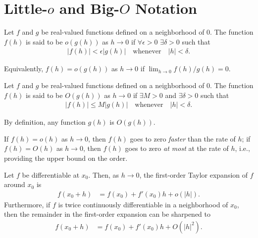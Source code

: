\documentclass[a4paper,12pt]{article}
\begin{document}
\appendix
\section{Little-$o$ and Big-$O$ Notation}

\begin{definition}\label{def-little-o}
	Let $f$ and $g$ be real-valued functions defined on a neighborhood of $0$.
	The function $f(h)$ is said to be $o(g(h))$ as $h \to 0$ if
	$\forall\epsilon>0$ $\exists\delta>0$ such that
	\begin{align}
		|f(h)| < \epsilon |g(h)|
		\quad\text{whenever}\quad
		|h| < \delta.
	\end{align}
\end{definition}

\begin{remark}
	Equivalently, $f(h) = o(g(h))$ as $h \to 0$ if $\lim_{h\to0}f(h)/g(h) = 0$.
\end{remark}

\begin{definition}\label{def-big-o}
	Let $f$ and $g$ be real-valued functions defined on a neighborhood of $0$.
	The function $f(h)$ is said to be $O(g(h))$ as $h \to 0$ if
	$\exists M>0$ and $\exists\delta>0$ such that
	\begin{align}
		|f(h)| \leq M |g(h)|
		\quad\text{whenever}\quad
		|h| < \delta.
	\end{align}
\end{definition}

\begin{remark}
	By definition, any function $g(h)$ is $O(g(h))$.
\end{remark}

\begin{remark}
	If $f(h)=o(h)$ as $h \to 0$, then $f(h)$ goes to zero \emph{faster} than the rate of $h$;
	if $f(h)=O(h)$ as $h \to 0$, then $f(h)$ goes to zero \emph{at most} at the rate of $h$, i.e.,
	providing the upper bound on the order.
\end{remark}

\begin{example}\label{eg-taylor-expansion}
	Let $f$ be differentiable at $x_0$.
	Then, as $h \to 0$, the first-order Taylor expansion of $f$ around $x_0$ is
	\begin{align}
		f(x_0 + h)
		&= f(x_0) + f'(x_0)h + o(|h|).
	\end{align}
	Furthermore, if $f$ is twice continuously differentiable in a neighborhood of $x_0$,
	then the remainder in the first-order expansion can be sharpened to
	\begin{align}
		f(x_0 + h)
		&= f(x_0) + f'(x_0)h + O(|h|^2).
	\end{align}
\end{example}
\end{document}
